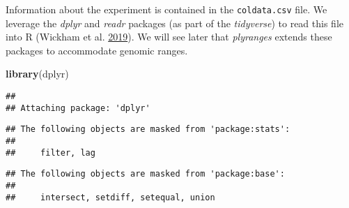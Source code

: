 \documentclass[
]{article}
\newenvironment{Shaded}{}{}
\newcommand{\DataTypeTok}[1]{\textcolor[rgb]{0.56,0.13,0.00}{#1}}
\newcommand{\KeywordTok}[1]{\textcolor[rgb]{0.00,0.44,0.13}{\textbf{#1}}}
\newcommand{\NormalTok}[1]{#1}
\newcommand{\OperatorTok}[1]{\textcolor[rgb]{0.40,0.40,0.40}{#1}}
\newcommand{\StringTok}[1]{\textcolor[rgb]{0.25,0.44,0.63}{#1}}
\begin{document}
Information about the experiment is contained in the \texttt{coldata.csv} file. We
leverage the \emph{dplyr} and \emph{readr} packages (as part of the \emph{tidyverse}) to read
this file into R (Wickham et al. \protect\hyperlink{ref-tidyverse}{2019}). We will see later that \emph{plyranges} extends these
packages to accommodate genomic ranges.

\begin{Shaded}
\begin{Highlighting}[]
\KeywordTok{library}\NormalTok{(dplyr)}
\end{Highlighting}
\end{Shaded}

\begin{verbatim}
## 
## Attaching package: 'dplyr'
\end{verbatim}

\begin{verbatim}
## The following objects are masked from 'package:stats':
## 
##     filter, lag
\end{verbatim}

\begin{verbatim}
## The following objects are masked from 'package:base':
## 
##     intersect, setdiff, setequal, union
\end{verbatim}

\begin{Shaded}
\end{Shaded}
\end{document}
